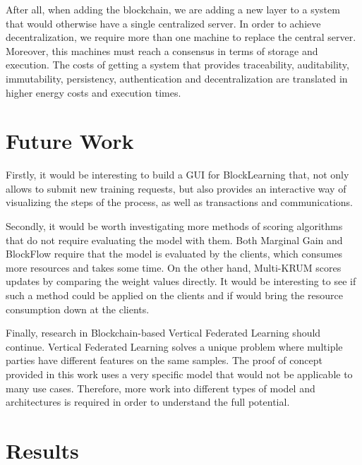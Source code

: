 After all, when adding the blockchain, we are adding a new layer to a system that would otherwise have a single centralized server. In order to achieve decentralization, we require more than one machine to replace the central server. Moreover, this machines must reach a consensus in terms of storage and execution. The costs of getting a system that provides traceability, auditability, immutability, persistency, authentication and decentralization are translated in higher energy costs and execution times.



\section{Future Work}\label{conclusions:future_work}

Firstly, it would be interesting to build a GUI for BlockLearning that, not only allows to submit new training requests, but also provides an interactive way of visualizing the steps of the process, as well as transactions and communications.

Secondly, it would be worth investigating more methods of scoring algorithms that do not require evaluating the model with them. Both Marginal Gain and BlockFlow require that the model is evaluated by the clients, which consumes more resources and takes some time. On the other hand, Multi-KRUM scores updates by comparing the weight values directly. It would be interesting to see if such a method could be applied on the clients and if would bring the resource consumption down at the clients.

Finally, research in Blockchain-based Vertical Federated Learning should continue. Vertical Federated Learning solves a unique problem where multiple parties have different features on the same samples. The proof of concept provided in this work uses a very specific model that would not be applicable to many use cases. Therefore, more work into different types of model and architectures is required in order to understand the full potential.

\section{Results}

